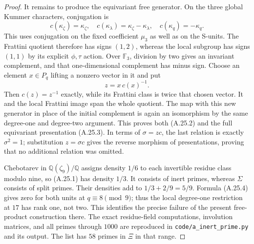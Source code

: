 \begin{proof}
It remains to produce the equivariant free generator.
On the three global Kummer characters, conjugation is
\[
 c(\kappa_\zeta)=\kappa_\zeta,
 \quad c(\kappa_\lambda)=\kappa_\zeta-\kappa_\lambda,
 \quad c(\kappa_q)=-\kappa_q.
 \tag{A.25.5}
\]
This uses conjugation on the fixed coefficient
$\mu_3$ as well as on the S-units. The Frattini
quotient therefore has signs $(1,2)$, whereas the
local subgroup has signs $(1,1)$ by its explicit
$\phi,\tau$ action. Over $\mathbb F_3$, division
by two gives an invariant complement, and that
one-dimensional complement has minus sign.
Choose an element $x\in P_q$ lifting a nonzero
vector in it and put
\[
                         z=x\,c(x)^{-1}.
\]
Then $c(z)=z^{-1}$ exactly, while its Frattini
class is twice that chosen vector. It and the
local Frattini image span the whole quotient.
The map with this new generator in place of the
initial complement is again an isomorphism by
the same degree-one and degree-two argument.
This proves both (A.25.2) and the full equivariant
presentation (A.25.3). In terms of $\sigma=zc$,
the last relation is exactly $\sigma^2=1$;
substitution $z=\sigma c$ gives the reverse
morphism of presentations, proving that no
additional relation was omitted.

Chebotarev in $\mathbb Q(\zeta_9)/\mathbb Q$
assigns density $1/6$ to each invertible residue
class modulo nine, so (A.25.1) has density $1/3$.
It consists of inert primes, whereas $\Sigma$
consists of split primes. Their densities add
to $1/3+2/9=5/9$. Formula (A.25.4) gives zero
for both units at $q\equiv8\pmod9$; thus the
local degree-one restriction at $17$ has rank
one, not two. This identifies the precise failure
of the present free-product construction there.
The exact residue-field computations, involution
matrices, and all primes through $1000$ are
reproduced in \texttt{code/a\_inert\_prime.py}
and its output. The list has $58$ primes in
$\Xi$ in that range.
\end{proof}

